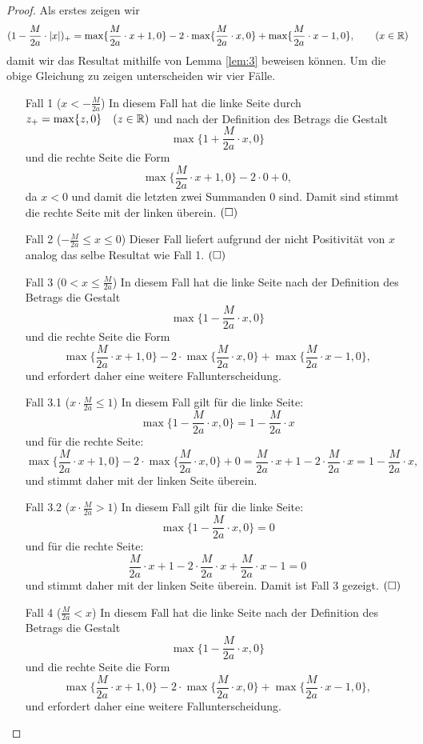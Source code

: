   \begin{proof}
  Als erstes zeigen wir $$(1 - \frac{M}{2a} \cdot |x|)_+ = \max\{\frac{M}{2a} \cdot x + 1, 0\} - 2 \cdot \max\{\frac{M}{2a} \cdot x, 0\} + \max\{\frac{M}{2a} \cdot x - 1, 0\}, \qquad (x \in \mathbb{R})$$ damit wir das Resultat mithilfe von Lemma \ref{lem:3} beweisen können.
  Um die obige Gleichung zu zeigen unterscheiden wir vier Fälle.
  \begin{itemize}
  \item[Fall 1] ($x < - \frac{M}{2a}$) In diesem Fall hat die linke Seite durch $z_+ = \max\{z, 0\} \quad (z \in \mathbb{R})$ und nach der Definition des Betrags die Gestalt $$\max\{1 + \frac{M}{2a} \cdot x, 0\}$$ und die rechte Seite die Form $$\max\{\frac{M}{2a} \cdot x + 1, 0\} - 2 \cdot 0 + 0,$$ da $x < 0$ und damit die letzten zwei Summanden 0 sind. Damit sind stimmt die rechte Seite mit der linken überein. $\hfill(\square)$
  \item[Fall 2] ($ - \frac{M}{2a} \leq x \leq 0$) Dieser Fall liefert aufgrund der nicht Positivität von $x$ analog das selbe Resultat wie Fall 1. $\hfill(\square)$
  \item[Fall 3] ($0 < x \leq \frac{M}{2a}$) In diesem Fall hat die linke Seite nach der Definition des Betrags die Gestalt $$\max\{1 - \frac{M}{2a} \cdot x, 0\}$$ und die rechte Seite die Form $$\max\{\frac{M}{2a} \cdot x + 1, 0\} - 2 \cdot \max\{\frac{M}{2a} \cdot x, 0\} + \max\{\frac{M}{2a} \cdot x - 1, 0\},$$ und erfordert daher eine weitere Fallunterscheidung.
  \item[Fall 3.1] ($x \cdot \frac{M}{2a} \leq 1$) In diesem Fall gilt für die linke Seite$\colon$ 
  $$\max\{1 - \frac{M}{2a} \cdot x, 0\} = 1 - \frac{M}{2a} \cdot x$$ und für die rechte Seite$\colon$ 
  $$\max\{\frac{M}{2a} \cdot x + 1, 0\} - 2 \cdot \max\{\frac{M}{2a} \cdot x, 0\} + 0 = \frac{M}{2a} \cdot x + 1 - 2 \cdot \frac{M}{2a} \cdot x = 1 - \frac{M}{2a} \cdot x,$$ und stimmt daher mit der linken Seite überein.
  \item[Fall 3.2] ($x \cdot \frac{M}{2a} > 1$) In diesem Fall gilt für die linke Seite$\colon$ 
  $$\max\{1 - \frac{M}{2a} \cdot x, 0\} = 0$$ und für die rechte Seite$\colon$ 
  $$\frac{M}{2a} \cdot x + 1 - 2 \cdot \frac{M}{2a} \cdot x + \frac{M}{2a} \cdot x - 1 = 0$$ und stimmt daher mit der linken Seite überein. Damit ist Fall 3 gezeigt. $\hfill(\square)$
  \item[Fall 4] ($\frac{M}{2a} < x$)  In diesem Fall hat die linke Seite nach der Definition des Betrags die Gestalt $$\max\{1 - \frac{M}{2a} \cdot x, 0\}$$ und die rechte Seite die Form $$\max\{\frac{M}{2a} \cdot x + 1, 0\} - 2 \cdot \max\{\frac{M}{2a} \cdot x, 0\} + \max\{\frac{M}{2a} \cdot x - 1, 0\},$$ und erfordert daher eine weitere Fallunterscheidung.

\end{itemize}
\end{proof}
